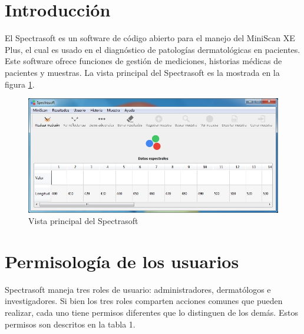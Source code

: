 \vfill
\section*{Introducci\'{o}n}
	El Spectrasoft es un software de c\'{o}digo abierto para el manejo del MiniScan XE Plus, el cual es usado en el diagn\'{o}stico de patolog\'{i}as dermatol\'{o}gicas en pacientes. Este software ofrece funciones de gesti\'{o}n de mediciones, historias m\'{e}dicas de pacientes y muestras. La vista principal del Spectrasoft es la mostrada en la figura \ref{fig:vista-principal}.

\begin{figure}[H]
  \centering
  \includegraphics[width=1\linewidth]{./img/vista-principal.jpg}
\caption[]{Vista principal del Spectrasoft\label{fig:vista-principal}}
\end{figure}
\vfill
\newpage

\section*{Permisolog\'{i}a de los usuarios}

	Spectrasoft maneja tres roles de usuario: administradores, dermat\'{o}logos e investigadores. Si bien los tres roles comparten acciones comunes que pueden realizar, cada uno tiene permisos diferentes que lo distinguen de los dem\'{a}s. Estos permisos son descritos en la tabla 1.

